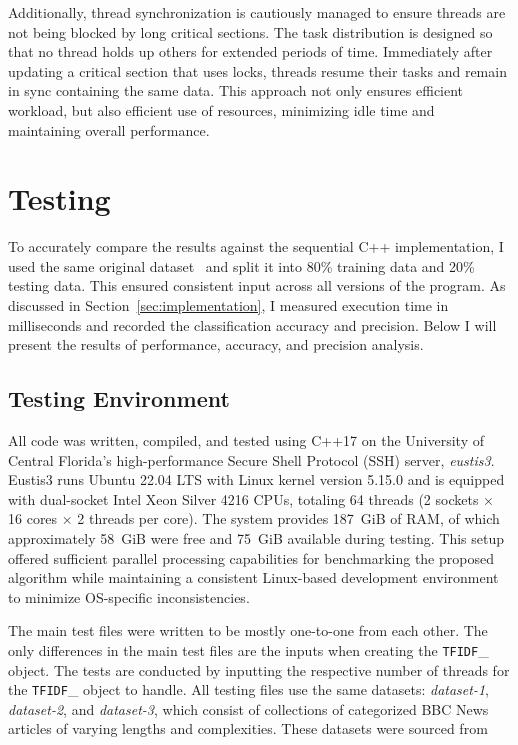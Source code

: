 \documentclass[conference]{IEEEtran}
\newcommand{\code}[1]{\lstinline[basicstyle=\ttfamily]|#1|}
\begin{document}
Additionally, thread synchronization is cautiously managed to ensure threads are not being blocked by long critical sections. The task distribution is designed so that no thread holds up others for extended periods of time. Immediately after updating a critical section that uses locks, threads resume their tasks and remain in sync containing the same data. This approach not only ensures efficient workload, but also efficient use of resources, minimizing idle time and maintaining overall performance.

\section{Testing} \label{sec:testing}
To accurately compare the results against the sequential C++ implementation, I used the same original dataset~\cite{b6} and split it into 80\% training data and 20\% testing data. This ensured consistent input across all versions of the program. As discussed in Section~\ref{sec:implementation}, I measured execution time in milliseconds and recorded the classification accuracy and precision. Below I will present the results of performance, accuracy, and precision analysis.

\subsection{Testing Environment}
All code was written, compiled, and tested using C++17 on the University of Central Florida’s high-performance Secure Shell Protocol (SSH) server, \textit{eustis3}. Eustis3 runs Ubuntu 22.04 LTS with Linux kernel version 5.15.0 and is equipped with dual-socket Intel\textsuperscript{\textregistered} Xeon\textsuperscript{\textregistered} Silver 4216 CPUs, totaling 64 threads (2 sockets × 16 cores × 2 threads per core). The system provides 187~GiB of RAM, of which approximately 58~GiB were free and 75~GiB available during testing. This setup offered sufficient parallel processing capabilities for benchmarking the proposed algorithm while maintaining a consistent Linux-based development environment to minimize OS-specific inconsistencies.

The main test files were written to be mostly one-to-one from each other. The only differences in the main test files are the inputs when creating the \code{TFIDF}\_ object. The tests are conducted by inputting the respective number of threads for the \code{TFIDF}\_ object to handle. All testing files use the same datasets: \textit{dataset-1}, \textit{dataset-2}, and \textit{dataset-3}, which consist of collections of categorized BBC News articles of varying lengths and complexities. These datasets were sourced from \cite{b6}
\end{document}
